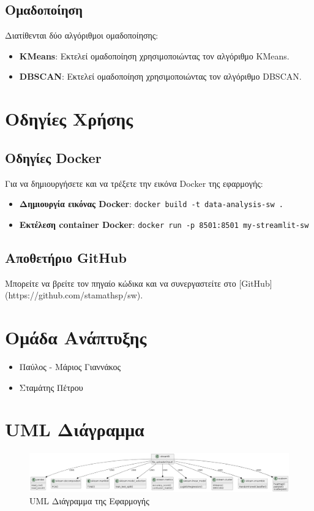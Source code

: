 \documentclass{article}
\begin{document}
\subsection{Ομαδοποίηση}
Διατίθενται δύο αλγόριθμοι ομαδοποίησης:
\begin{itemize}
    \item \textbf{KMeans}: Εκτελεί ομαδοποίηση χρησιμοποιώντας τον αλγόριθμο KMeans.
    \item \textbf{DBSCAN}: Εκτελεί ομαδοποίηση χρησιμοποιώντας τον αλγόριθμο DBSCAN.
\end{itemize}

\section{Οδηγίες Χρήσης}
\subsection{Οδηγίες Docker}
Για να δημιουργήσετε και να τρέξετε την εικόνα Docker της εφαρμογής:
\begin{itemize}
    \item \textbf{Δημιουργία εικόνας Docker}: \texttt{docker build -t data-analysis-sw .}
    \item \textbf{Εκτέλεση container Docker}: \texttt{docker run -p 8501:8501 my-streamlit-sw}
\end{itemize}

\subsection{Αποθετήριο GitHub}
Μπορείτε να βρείτε τον πηγαίο κώδικα και να συνεργαστείτε στο [GitHub](https://github.com/stamathsp/sw).

\section{Ομάδα Ανάπτυξης}
\begin{itemize}
    \item Παύλος - Μάριος Γιαννάκος
    \item Σταμάτης Πέτρου
\end{itemize}

\section{UML Διάγραμμα}
\begin{figure}[h]
    \centering
    \includegraphics[width=\textwidth]{UML_diagram.jpg}
    \caption{UML Διάγραμμα της Εφαρμογής}
\end{figure}
\end{document}
